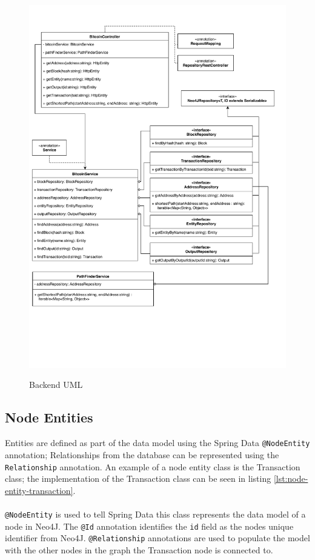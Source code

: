 \begin{figure}
  \centering
  \includegraphics[width = 15cm]{./figures/backend-uml}\\[0.5cm] 
  \caption{Backend UML}
  \label{fig:backend-uml}
\end{figure}

\subsection{Node Entities}
Entities are defined as part of the data model using the Spring Data \texttt{@NodeEntity} annotation; Relationships from the database can be represented using the \texttt{Relationship} annotation. An example of a node entity class is the Transaction class; the implementation of the Transaction class can be seen in listing \ref{lst:node-entity-transaction}.
\\\\
\texttt{@NodeEntity} is used to tell Spring Data this class represents the data model of a node in Neo4J. The \texttt{@Id} annotation identifies the \texttt{id} field as the nodes unique identifier from Neo4J. \texttt{@Relationship} annotations are used to populate the model with the other nodes in the graph the Transaction node is connected to. 

